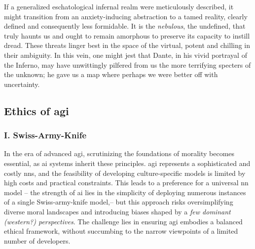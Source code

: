 \documentclass[11pt,a4]{article}
\begin{document}
        \par
        If a generalized eschatological infernal realm were meticulously described, it might transition from an anxiety-inducing abstraction to a tamed reality, clearly defined and consequently less formidable. It is the \textit{nebulous}, the undefined, that truly haunts us and ought to remain amorphous to preserve its capacity to instill dread. These threats linger best in the space of the virtual, potent and chilling in their ambiguity. In this vein, one might jest that Dante, in his vivid portrayal of the Inferno, may have unwittingly pilfered from us the more terrifying specters of the unknown; he gave us a map where perhaps we were better off with uncertainty.













\subsection{Ethics of \acrshort{agi} }

\subsubsection{I. Swiss-Army-Knife}

In the era of advanced \acrshort{agi}, scrutinizing the foundations of
morality becomes essential, as \acrshort{ai} systems inherit
these principles.
\acrshort{agi} represents a sophisticated and costly \glspl{nn}, and
the feasibility of developing culture-specific models is
limited by high costs and practical constraints. This leads
to a preference for a universal \acrshort{nn} model -- the
strength of \acrshort{ai} lies in the simplicity of deploying numerous instances of a single Swiss-army-knife  model,--  but this approach
risks oversimplifying diverse moral landscapes and
introducing biases shaped by a \textit{few dominant
(western?) perspectives}. The challenge lies in
ensuring \acrshort{agi} embodies a balanced ethical framework,
without succumbing to the narrow viewpoints of a limited number of developers.
\end{document}
